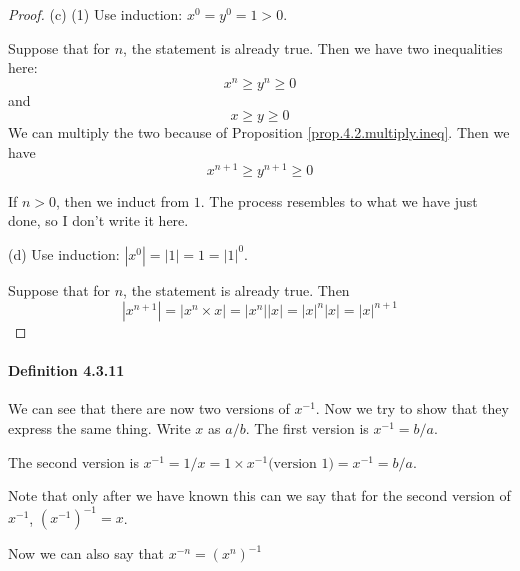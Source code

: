 \begin{proof}
(c)
(1)
Use induction: $x^0 = y^0 =1>0$.

Suppose that for $n$, the statement is already true. Then we have two inequalities here:
\[
x^n \geq y^n \geq 0
\]
and
\[
x \geq y \geq 0
\]
We can multiply the two because of Proposition \ref{prop.4.2.multiply.ineq}. Then we have 
\[
x^{n+1} \geq y^{n+1} \geq 0
\]

If $n>0$, then we induct from $1$. The process resembles to what we have just done, so I don't write it here.

(d)
Use induction: $|x^0| = |1| =1 =|1|^0$. 

Suppose that for $n$, the statement is already true. Then 
\[
|x^{n+1}| = |x^n \times x| = |x^n| |x| = |x|^n |x| = |x|^{n+1}
\]
\end{proof}

\paragraph{Definition 4.3.11}
We can see that there are now two versions of $x^{-1}$. Now we try to show that they express the same thing. 
Write $x$ as $a/b$. The first version is $x^{-1} = b/a$. 

The second version is $x^{-1} = 1/x = 1 \times x^{-1}\text{(version 1)} = x^{-1} = b/a$.

Note that only after we have known this can we say that for the second version of $x^{-1}$, 
$(x^{-1})^{-1} = x$.

Now we can also say that $x^{-n} = (x^n)^{-1}$


